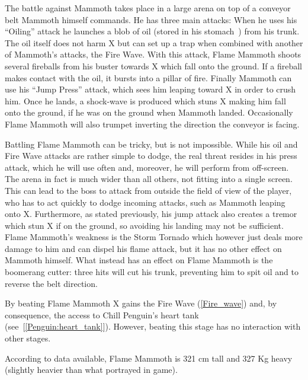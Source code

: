The battle against Mammoth takes place in a large arena on top of a conveyor belt Mammoth himself commands. He has three main attacks: When he uses his ``Oiling'' attack he launches a blob of oil (stored in his stomach~\cite{wayback:X_resources}) from his trunk. 
The oil itself does not harm X but can set up a trap when combined with another of Mammoth's attacks, the Fire Wave. With this attack, Flame Mammoth shoots several fireballs from his buster towards X which fall onto the ground. If a fireball makes contact with the oil, it bursts into a pillar of fire. Finally Mammoth can use his ``Jump Press'' attack, which sees him leaping toward X in order to crush him. Once he lands, a shock-wave is produced which stuns X making him fall onto the ground, if he was on the ground when Mammoth landed. Occasionally Flame Mammoth will also trumpet inverting the direction the conveyor is facing. 

Battling Flame Mammoth can be tricky, but is not impossible. While his oil and Fire Wave attacks are rather simple to dodge, the real threat resides in his press attack, which he will use often and, moreover, he will perform from off-screen. The arena in fact is much wider than all others, not fitting into a single screen. This can lead to the boss to attack from outside the field of view of the player, who has  to act quickly to dodge incoming attacks, such as Mammoth leaping onto X. Furthermore, as stated previously, his jump attack also creates a tremor which stun X if on the ground, so avoiding his landing may not be sufficient. Flame Mammoth's weakness is the Storm Tornado which however just deals more damage to him and can dispel his flame attack, but it has no other effect on Mammoth himself. What instead has an effect on Flame Mammoth is the boomerang cutter: three hits will cut his trunk, preventing him to spit oil and to reverse the belt direction.

By beating Flame Mammoth X gains the Fire Wave (\ref{Fire_wave}) and, by consequence, the access to Chill Penguin's heart tank (see~[\ref{Penguin:heart_tank}]). However, beating this stage has no interaction with other stages.

According to data available, Flame Mammoth is 321 cm tall and 327 Kg heavy (slightly heavier than what portrayed in game).

